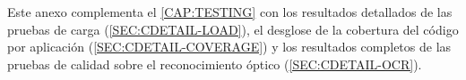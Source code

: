 Este anexo complementa el \cref{CAP:TESTING} con los resultados
detallados de las pruebas de carga
(\cref{SEC:CDETAIL-LOAD}), el desglose de la cobertura del código por
aplicación (\cref{SEC:CDETAIL-COVERAGE}) y los resultados completos de
las pruebas de calidad sobre el reconocimiento óptico
(\cref{SEC:CDETAIL-OCR}).
